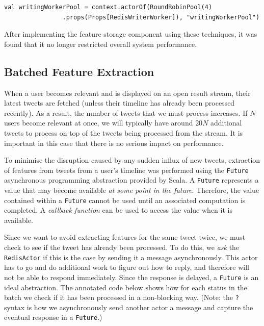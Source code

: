 \documentclass{l4proj}
\newcommand{\code}[1]{\texttt{#1}}
\begin{document}
        \begin{lstlisting}[caption=Creating an actor pool to reduce the work required by any single actor.]
          val writingWorkerPool = context.actorOf(RoundRobinPool(4)
                .props(Props[RedisWriterWorker]), "writingWorkerPool")
        \end{lstlisting}

        
        After implementing the feature storage component using these techniques, it was found that it no longer restricted overall system performance.
        
        \subsection{Batched Feature Extraction}
        When a user becomes relevant and is displayed on an open result stream, their latest tweets are fetched (unless their timeline has already been processed recently). As a result, the number of tweets that we must process increases. If $N$ users become relevant at once, we will typically have around $20N$ additional tweets to process on top of the tweets being processed from the stream. It is important in this case that there is no serious impact on performance.
        
        To minimise the disruption caused by any sudden influx of new tweets, extraction of features from tweets from a user's timeline was performed using the \code{Future} asynchronous programming abstraction provided by Scala. A \code{Future} represents a value that may become available \textit{at some point in the future}. Therefore, the value contained within a \code{Future} cannot be used until an associated computation is completed. A \textit{callback function} can be used to access the value when it is available.
        
        Since we want to avoid extracting features for the same tweet twice, we must check to see if the tweet has already been processed. To do this, we \textit{ask} the \code{RedisActor} if this is the case by sending it a message asynchronously. This actor has to go and do additional work to figure out how to reply, and therefore will not be able to respond immediately. Since the response is delayed, a \code{Future} is an ideal abstraction. The annotated code below shows how for each status in the batch we check if it has been processed in a non-blocking way. (Note: the \code{?} syntax is how we asynchronously send another actor a message and capture the eventual response in a \code{Future}.)
        
\end{document}
